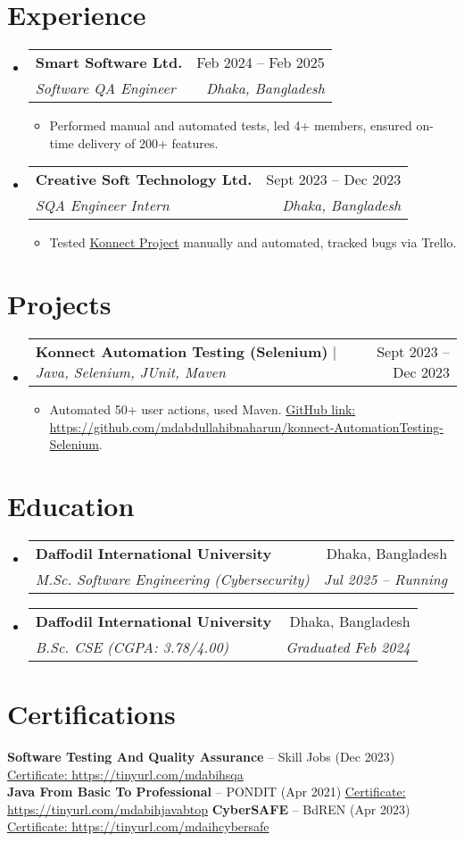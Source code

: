 \documentclass[letterpaper,11pt]{article}
\makeatletter
\newcommand{\resumeItem}[1]{
  \item\small{
    {#1 \vspace{-1pt}}
  }
}
\newcommand{\resumeSubheading}[4]{
  \vspace{-1pt}\item
    \begin{tabular*}{0.97\textwidth}[t]{l@{\extracolsep{\fill}}r}
      \textbf{#1} & #2 \\
      \textit{\small#3} & \textit{\small #4} \\
    \end{tabular*}\vspace{-3pt}
}
\newcommand{\resumeProjectHeading}[2]{
    \item
    \begin{tabular*}{0.97\textwidth}{l@{\extracolsep{\fill}}r}
      \small#1 & #2 \\
    \end{tabular*}\vspace{-3pt}
}
\newcommand{\resumeSubHeadingListStart}{\begin{itemize}[leftmargin=0.15in, itemsep=2pt, parsep=1pt, topsep=2pt, label={}]}
\newcommand{\resumeSubHeadingListEnd}{\end{itemize}}
\newcommand{\resumeItemListStart}{\begin{itemize}[itemsep=1.5pt, parsep=1pt, topsep=1.5pt]}
\newcommand{\resumeItemListEnd}{\end{itemize}\vspace{-3pt}}
\makeatother
\begin{document}
\section{Experience}
\resumeSubHeadingListStart

    \resumeSubheading
      {Smart Software Ltd.}{Feb 2024 -- Feb 2025}
      {Software QA Engineer}{Dhaka, Bangladesh}
      \resumeItemListStart
        \resumeItem{Performed manual and automated tests, led 4+ members, ensured on-time delivery of 200+ features.}
      \resumeItemListEnd

    \resumeSubheading
      {Creative Soft Technology Ltd.}{Sept 2023 -- Dec 2023}
      {SQA Engineer Intern}{Dhaka, Bangladesh}
      \resumeItemListStart
        \resumeItem{Tested \href{https://konnect.creativesofttechnology.com/}{Konnect Project} manually and automated, tracked bugs via Trello.}
      \resumeItemListEnd

\resumeSubHeadingListEnd

\section{Projects}
\resumeSubHeadingListStart
    \resumeProjectHeading
      {\textbf{Konnect Automation Testing (Selenium)} $|$ \emph{Java, Selenium, JUnit, Maven}}{Sept 2023 -- Dec 2023}
      \resumeItemListStart
        \resumeItem{Automated 50+ user actions, used Maven. \href{https://github.com/mdabdullahibnaharun/konnect-AutomationTesting-Selenium}{ GitHub link: https://github.com/mdabdullahibnaharun/konnect-AutomationTesting-Selenium}.}
      \resumeItemListEnd
\resumeSubHeadingListEnd

\section{Education}
\resumeSubHeadingListStart
    \resumeSubheading
      {Daffodil International University}{Dhaka, Bangladesh}
      {M.Sc. Software Engineering (Cybersecurity)}{Jul 2025 -- Running}
    \resumeSubheading
      {Daffodil International University}{Dhaka, Bangladesh}
      {B.Sc. CSE (CGPA: 3.78/4.00)}{Graduated Feb 2024}
\resumeSubHeadingListEnd

\section{Certifications}
\begin{itemize}[leftmargin=0.15in, itemsep=1pt, parsep=1pt, topsep=1pt, label={}]
    \small{\item{
     \textbf{Software Testing And Quality Assurance} – Skill Jobs (Dec 2023) \href{https://tinyurl.com/mdabihsqa}{Certificate: https://tinyurl.com/mdabihsqa} \\
     \textbf{Java From Basic To Professional} – PONDIT (Apr 2021) \href{https://tinyurl.com/mdabihjavabtop}{Certificate: https://tinyurl.com/mdabihjavabtop}
    \textbf{CyberSAFE} – BdREN (Apr 2023) \href{https://tinyurl.com/mdabihjavabtop}{Certificate: https://tinyurl.com/mdaihcybersafe}
    }}
\end{itemize}
\end{document}
